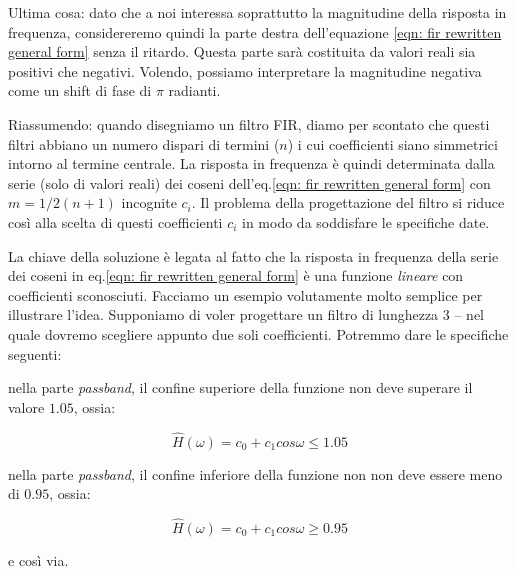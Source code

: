 Ultima cosa: dato che a noi interessa soprattutto la magnitudine della
risposta in frequenza, considereremo quindi la parte destra dell'equazione
\ref{eqn: fir rewritten general form} senza il ritardo.
Questa parte sar\`a costituita da valori reali sia positivi che negativi.
Volendo, possiamo interpretare la magnitudine negativa come un shift di fase di $\pi$
radianti.

Riassumendo: quando disegniamo un filtro FIR, diamo per scontato che questi
filtri abbiano un numero dispari di termini ($n$)
i cui coefficienti siano simmetrici intorno al termine centrale.
La risposta in frequenza \`e quindi determinata dalla serie (solo di valori
reali) dei coseni dell'eq.\ref{eqn: fir rewritten general form} con $m = 1/2 ( n + 1 ) $
incognite $c_i$.
Il problema della progettazione del filtro si riduce cos\`i alla scelta di
questi coefficienti $c_i$ in modo da soddisfare le specifiche date.

%
%

La chiave della soluzione \`e legata al fatto che la risposta in frequenza
della serie dei coseni in eq.\ref{eqn: fir rewritten general form} \`e una
funzione \emph{lineare} con coefficienti sconosciuti.
Facciamo un esempio volutamente molto semplice per illustrare l'idea.
Supponiamo di voler progettare un filtro di lunghezza $3$ -- nel quale dovremo
scegliere appunto due soli coefficienti.
Potremmo dare le specifiche seguenti:

\begin{compactenum}

	\item nella parte \emph{passband}, il confine superiore della funzione non
					deve superare il valore $1.05$, ossia:

					\begin{equation}
						\hat{H} (\omega) = c_0 + c_1 cos \omega \leq 1.05
					\end{equation}

	
	\item nella parte \emph{passband}, il confine inferiore della funzione non
					non deve essere meno di $0.95$, ossia:

					\begin{equation}
						\hat{H} (\omega) = c_0 + c_1 cos \omega \geq 0.95
					\end{equation}

	\item e cos\`i via.

\end{compactenum}

